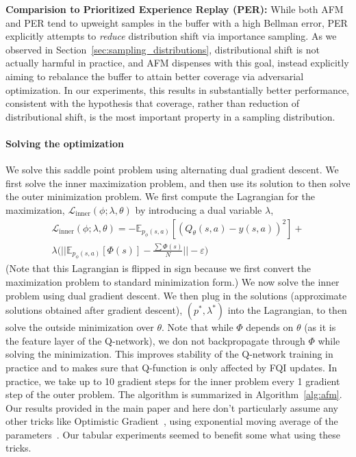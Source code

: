 \textbf{Comparision to Prioritized Experience Replay (PER): }While both AFM and PER tend to upweight samples in the buffer with a high Bellman error, PER explicitly attempts to \emph{reduce} distribution shift via importance sampling. As we observed in Section~\ref{sec:sampling_distributions}, distributional shift is not actually harmful in practice, and AFM dispenses with this goal, instead explicitly aiming to rebalance the buffer to attain better coverage via adversarial optimization. In our experiments, this results in substantially better performance, consistent with the hypothesis that coverage, rather than reduction of distributional shift, is the most important property in a sampling distribution.

\paragraph{Solving the optimization} We solve this saddle point problem using alternating dual gradient descent. We first solve the inner maximization problem, and then use its solution to then solve the outer minimization problem. We first compute the Lagrangian for the maximization, $\mathcal{L}_{\text{inner}}({\phi; \lambda, \theta})$ by introducing a dual variable $\lambda$,
\begin{multline*}
    \mathcal{L}_{\text{inner}}({\phi; \lambda, \theta}) =  -\mathbb{E}_{p_\phi(s, a)} [(Q_\theta (s, a) - y(s, a))^2] +\\ \lambda \big( \vert\vert \mathbb{E}_{p_\phi(s, a)}[\Phi(s)] - \frac{\sum \Phi(s)}{N} \vert\vert - \varepsilon \big)
\end{multline*}
(Note that this Lagrangian is flipped in sign because we first convert the maximization problem to standard minimization form.) We now solve the inner problem using dual gradient descent. We then plug in the solutions (approximate solutions obtained after gradient descent), $(p^*, \lambda^*)$ into the Lagrangian, to then solve the outside minimization over $\theta$. Note that while $\Phi$  depends on $\theta$ (as it is the feature layer of the Q-network), we don not backpropagate through $\Phi$ while solving the minimization. This improves stability of the Q-network training in practice and to makes sure that Q-function is only affected by FQI updates. In practice, we take up to 10 gradient steps for the inner problem every 1 gradient step of the outer problem. The algorithm is summarized in Algorithm~\ref{alg:afm}. Our results provided in the main paper and here don't particularly assume any other tricks like Optimistic Gradient~\citep{daskalakis2018training}, using exponential moving average of the parameters~\citep{yaz2018the}. Our tabular experiments seemed to benefit some what using these tricks.   

